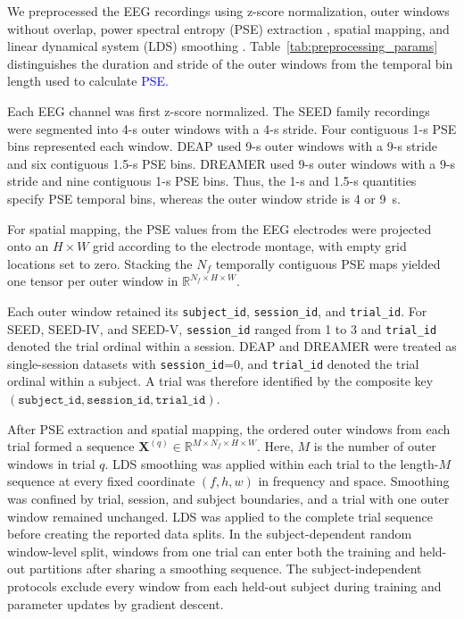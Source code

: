 \documentclass[12pt]{article}
\newcommand{\rev}[1]{\textcolor{blue}{#1}}
\begin{document}
We preprocessed the EEG recordings using z-score normalization, outer windows without overlap, power spectral entropy (PSE) extraction \cite{PSE}, spatial mapping, and linear dynamical system (LDS) smoothing \cite{ref65}. Table~\ref{tab:preprocessing_params} distinguishes the duration and stride of the outer windows from the temporal bin length used to calculate \rev{PSE.}

Each EEG channel was first z-score normalized. The SEED family recordings were segmented into 4-s outer windows with a 4-s stride. Four contiguous 1-s PSE bins represented each window. DEAP used 9-s outer windows with a 9-s stride and six contiguous 1.5-s PSE bins. DREAMER used 9-s outer windows with a 9-s stride and nine contiguous 1-s PSE bins. Thus, the 1-s and 1.5-s quantities specify PSE temporal bins, whereas the outer window stride is 4 or 9~s.

For spatial mapping, the PSE values from the EEG electrodes were projected onto an $H \times W$ grid according to the electrode montage, with empty grid locations set to zero. Stacking the $N_f$ temporally contiguous PSE maps yielded one tensor per outer window in $\mathbb{R}^{N_f \times H \times W}$.

Each outer window retained its \texttt{subject\_id}, \texttt{session\_id}, and \texttt{trial\_id}. For SEED, SEED-IV, and SEED-V, \texttt{session\_id} ranged from 1 to 3 and \texttt{trial\_id} denoted the trial ordinal within a session. DEAP and DREAMER were treated as single-session datasets with \texttt{session\_id}=0, and \texttt{trial\_id} denoted the trial ordinal within a subject. A trial was therefore identified by the composite key $(\texttt{subject\_id},\texttt{session\_id},\texttt{trial\_id})$.

After PSE extraction and spatial mapping, the ordered outer windows from each trial formed a sequence $\mathbf{X}^{(q)} \in \mathbb{R}^{M \times N_f \times H \times W}$. Here, $M$ is the number of outer windows in trial $q$. LDS smoothing was applied within each trial to the length-$M$ sequence at every fixed coordinate $(f,h,w)$ in frequency and space. Smoothing was confined by trial, session, and subject boundaries, and a trial with one outer window remained unchanged. LDS was applied to the complete trial sequence before creating the reported data splits. In the subject-dependent random window-level split, windows from one trial can enter both the training and held-out partitions after sharing a smoothing sequence. The subject-independent protocols exclude every window from each held-out subject during training and parameter updates by gradient descent.
\end{document}
